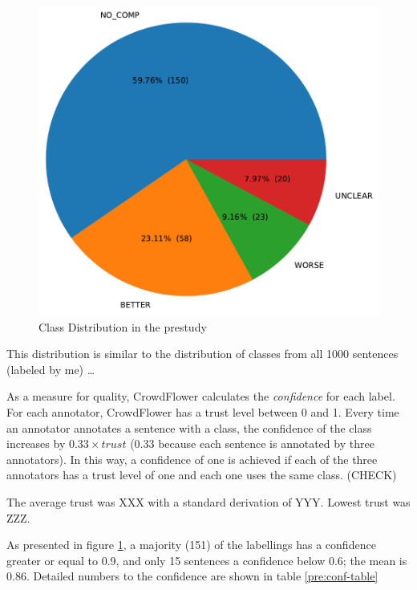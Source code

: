 \begin{figure}[h]
\centering
\caption{Class Distribution in the prestudy}
\label{pre:dist}
\includegraphics[scale=0.6]{images/prestudy/label_distribution.pdf}
\end{figure}

This distribution is similar to the distribution of classes from all 1000 sentences (labeled by me) \ldots

As a measure for quality, CrowdFlower calculates the \emph{confidence} for each label. For each annotator, CrowdFlower has a trust level between 0 and 1. Every time an annotator annotates a sentence with a class, the confidence of the class increases by $0.33 \times trust$ (0.33 because each sentence is annotated by three annotators). In this way, a confidence of one is achieved if each of the three annotators has a trust level of one and each one uses the same class. (CHECK)

The average trust was XXX with a standard derivation of YYY. Lowest trust was ZZZ.


As presented in figure \ref{pre:dist}, a majority (151) of the labellings has a confidence greater or equal to 0.9, and only 15 sentences a confidence below 0.6; the mean is 0.86. Detailed numbers to the confidence are shown in table \ref{pre:conf-table}




